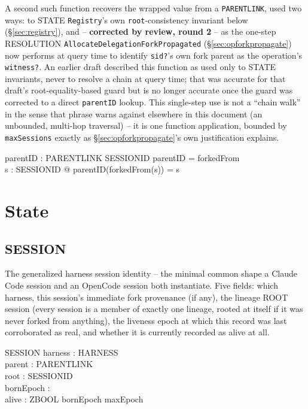 \documentclass[a4paper,10pt,fleqn]{article}
\newcommand{\field}[1]{\texttt{#1}}
\begin{document}
A second such function recovers the wrapped value from a
\field{PARENTLINK}, used two ways: to STATE \field{Registry}'s own
\field{root}-consistency invariant below (\S\ref{sec:registry}), and --
\textbf{corrected by review, round 2} -- as the one-step RESOLUTION
\field{AllocateDelegationForkPropagated} (\S\ref{sec:opforkpropagate})
now performs at query time to identify \field{sid?}'s own fork parent
as the operation's \field{witness?}. An earlier draft described this
function as used only to STATE invariants, never to resolve a chain at
query time; that was accurate for that draft's root-equality-based
guard but is no longer accurate once the guard was corrected to a
direct \field{parentID} lookup. This single-step use is not a ``chain
walk'' in the sense that phrase warns against elsewhere in this
document (an unbounded, multi-hop traversal) -- it is one function
application, bounded by \field{maxSessions} exactly as
\S\ref{sec:opforkpropagate}'s own justification explains.

\begin{axdef}
parentID : PARENTLINK \pfun SESSIONID
\where
\dom parentID = \ran forkedFrom \\
\forall s : SESSIONID @ parentID(forkedFrom(s)) = s
\end{axdef}

\section{State}
\label{sec:state}

\subsection{SESSION}
\label{sec:session-schema}

The generalized harness session identity -- the minimal common shape a
Claude Code session and an OpenCode session both instantiate. Five
fields: which harness, this session's immediate fork provenance (if
any), the lineage ROOT session (every session is a member of exactly
one lineage, rooted at itself if it was never forked from anything),
the liveness epoch at which this record was last corroborated as real,
and whether it is currently recorded as alive at all.

\begin{schema}{SESSION}
harness : HARNESS \\
parent : PARENTLINK \\
root : SESSIONID \\
bornEpoch : \nat \\
alive : ZBOOL
\where
bornEpoch \leq maxEpoch
\end{schema}
\end{document}
